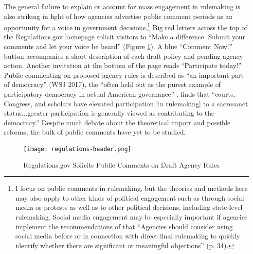The general failure to explain or account for mass engagement in rulemaking is also striking in light of how agencies advertise public comment periods as an opportunity for a voice in government decisions.\footnote{
I focus on public comments in rulemaking, but the theories and methods here may also apply to other kinds of political engagement such as through social media or protests as well as to other political decisions, including state-level rulemaking. Social media engagement may be especially important if agencies implement the recommendations of \citet{ACUS2018} that ``Agencies should consider using social media before or in connection with direct final rulemaking to quickly identify whether there are significant or meaningful objections'' (p. 34). 
} 
Big red letters across the top of the Regulations.gov homepage solicit visitors to ``Make a difference. Submit your comments and let your voice be heard'' (Figure \ref{fig:regs.gov}). A blue ``Comment Now!'' button accompanies a short description of each draft policy and pending agency action. 
Another invitation at the bottom of the page reads ``Participate today!''
Public commenting on proposed agency rules is described as ``an important part of democracy'' (WSJ 2017), the ``often held out as the purest example of participatory democracy in actual American governance'' \citep{Herz2016}. \citet{Rossi1997} finds that ``courts, Congress, and scholars have elevated participation [in rulemaking] to a sacrosanct status...greater participation is generally viewed as contributing to the democracy.'' %
Despite much debate about the theoretical import and possible reforms, the bulk of public comments have yet to be studied.

\begin{figure}[t]
    \centering
    \caption{Regulations.gov Solicits Public Comments on Draft Agency Rules}
    \label{fig:regs.gov}
    
    \texttt{[image: regulations-header.png]}
\end{figure}

